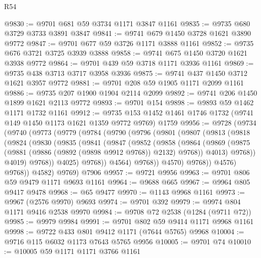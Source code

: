 \begin{lexlean}{R54}
\begin{coremodule}
@9830 := @9701 @681 @59 @3734 @1171 @3847 @1161
@9835 := @9735 @680 @3729 @3733 @3891 @3847
@9841 := @9741 @679 @1450 @3728 @1621 @3890 @9772
@9847 := @9701 @677 @59 @3726 @1171 @3888 @1161
@9852 := @9735 @676 @3721 @3725 @3939 @3888
@9858 := @9741 @675 @1450 @3720 @1621 @3938 @9772
@9864 := @9701 @439 @59 @3718 @1171 @3936 @1161
@9869 := @9735 @438 @3713 @3717 @3958 @3936
@9875 := @9741 @437 @1450 @3712 @1621 @3957 @9772
@9881 := @9701 @208 @59 @1905 @1171 @2099 @1161
@9886 := @9735 @207 @1900 @1904 @2114 @2099
@9892 := @9741 @206 @1450 @1899 @1621 @2113 @9772
@9893 := @9701 @154
@9898 := @9893 @59 @1462 @1171 @1732 @1161
@9912 := @9735 @153 @1452 @1461 @1746 @1732 (@9741 @149 @1450 @1173 @1621 @1359 @9772 @9769) @1759
@9956 := @9728
    (@9734
      (@9740
        (@9773
          (@9779
            (@9784
              (@9790
                (@9796
                  (@9801
                    (@9807
                      (@9813
                        (@9818
                          (@9824
                            (@9830
                              (@9835
                                (@9841
                                  (@9847
                                    (@9852
                                      (@9858
                                        (@9864
                                          (@9869
                                            (@9875
                                              (@9881
                                                (@9886 (@9892 (@9898 @9912 @9768)) @2132)
                                                @9768))
                                            @4013)
                                          @9768))
                                      @4019)
                                    @9768))
                                @4025)
                              @9768))
                          @4564)
                        @9768))
                    @4570)
                  @9768))
              @4576)
            @9768))
        @4582)
      @9769)
    @7906
@9957 := @9721 @9956
@9963 := @9701 @806 @59 @9479 @1171 @9693 @1161
@9964 := @9688 @665
@9967 := @9964 @805 @9417 @9478
@9968 := @65 @9477
@9970 := @1143 @9968 @1161
@9973 := @9967 (@2576 @9970) @9693
@9974 := @9701 @392
@9979 := @9974 @804 @1171 @9416 @2538 @9970
@9984 := @9708 @72 @2538 (@1284 (@9711 @72))
@9985 := @9979 @9984
@9991 := @9701 @802 @59 @9414 @1171 @9968 @1161
@9998 := @9722 @433 @801 @9412 @1171 (@7644 @5765) @9968
@10004 := @9716 @115 @6032 @1173 @7643 @5765 @9956
@10005 := @9701 @74
@10010 := @10005 @59 @1171 @1171 @3766 @1161

\end{coremodule}
\end{lexlean}
